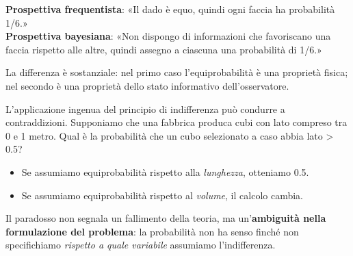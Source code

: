 \documentclass[
  italian,
  letterpaper,
  a4paper,
  11pt,
  open=any]{scrbook}
\providecommand{\tightlist}{%
  \setlength{\itemsep}{0pt}\setlength{\parskip}{0pt}}
\theoremstyle{plain}
\theoremstyle{definition}
\theoremstyle{definition}
\theoremstyle{remark}
\begin{document}
\begin{tcolorbox}[enhanced jigsaw, arc=.35mm, bottomrule=.15mm, bottomtitle=1mm, breakable, colback=white, colbacktitle=quarto-callout-important-color!10!white, colframe=quarto-callout-important-color-frame, coltitle=black, left=2mm, leftrule=.75mm, opacityback=0, opacitybacktitle=0.6, rightrule=.15mm, title=\textcolor{quarto-callout-important-color}{\faExclamation}\hspace{0.5em}{Due modi di pensare all'equiprobabilità}, titlerule=0mm, toprule=.15mm, toptitle=1mm]

\textbf{Prospettiva frequentista}: «Il dado è equo, quindi ogni faccia
ha probabilità 1/6.»\\
\textbf{Prospettiva bayesiana}: «Non dispongo di informazioni che
favoriscano una faccia rispetto alle altre, quindi assegno a ciascuna
una probabilità di 1/6.»

La differenza è sostanziale: nel primo caso l'equiprobabilità è una
proprietà fisica; nel secondo è una proprietà dello stato informativo
dell'osservatore.

\end{tcolorbox}

\begin{tcolorbox}[enhanced jigsaw, arc=.35mm, bottomrule=.15mm, bottomtitle=1mm, breakable, colback=white, colbacktitle=quarto-callout-note-color!10!white, colframe=quarto-callout-note-color-frame, coltitle=black, left=2mm, leftrule=.75mm, opacityback=0, opacitybacktitle=0.6, rightrule=.15mm, title=\textcolor{quarto-callout-note-color}{\faInfo}\hspace{0.5em}{Il paradosso di Bertrand (approfondimento)}, titlerule=0mm, toprule=.15mm, toptitle=1mm]

L'applicazione ingenua del principio di indifferenza può condurre a
contraddizioni. Supponiamo che una fabbrica produca cubi con lato
compreso tra 0 e 1 metro. Qual è la probabilità che un cubo selezionato
a caso abbia lato \textgreater{} 0.5?

\begin{itemize}
\tightlist
\item
  Se assumiamo equiprobabilità rispetto alla \emph{lunghezza}, otteniamo
  0.5.
\item
  Se assumiamo equiprobabilità rispetto al \emph{volume}, il calcolo
  cambia.
\end{itemize}

Il paradosso non segnala un fallimento della teoria, ma
un'\textbf{ambiguità nella formulazione del problema}: la probabilità
non ha senso finché non specifichiamo \emph{rispetto a quale variabile}
assumiamo l'indifferenza.

\end{tcolorbox}
\end{document}
